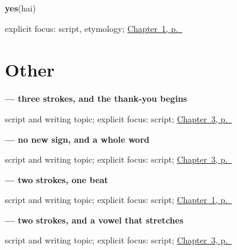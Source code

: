 \noindent\begin{minipage}[t]{\linewidth}
\raggedright
\textbf{yes}\enspace\emph{}\enspace(hai)\par
\footnotesize explicit focus: script, etymology; \hyperref[ch:ja-two-answers]{Chapter~1, p.~\pageref*{ch:ja-two-answers}}
\end{minipage}\par\smallskip

\section*{Other}

\noindent\begin{minipage}[t]{\linewidth}
\raggedright
\textbf{ — three strokes, and the thank-you begins}\par
\footnotesize script and writing topic; explicit focus: script; \hyperref[ch:ja-plain-thanks]{Chapter~3, p.~\pageref*{ch:ja-plain-thanks}}
\end{minipage}\par\smallskip

\noindent\begin{minipage}[t]{\linewidth}
\raggedright
\textbf{ — no new sign, and a whole word}\par
\footnotesize script and writing topic; explicit focus: script; \hyperref[ch:ja-plain-thanks]{Chapter~3, p.~\pageref*{ch:ja-plain-thanks}}
\end{minipage}\par\smallskip

\noindent\begin{minipage}[t]{\linewidth}
\raggedright
\textbf{ — two strokes, one beat}\par
\footnotesize script and writing topic; explicit focus: script; \hyperref[ch:ja-two-answers]{Chapter~1, p.~\pageref*{ch:ja-two-answers}}
\end{minipage}\par\smallskip

\noindent\begin{minipage}[t]{\linewidth}
\raggedright
\textbf{ — two strokes, and a vowel that stretches}\par
\footnotesize script and writing topic; explicit focus: script; \hyperref[ch:ja-plain-thanks]{Chapter~3, p.~\pageref*{ch:ja-plain-thanks}}
\end{minipage}\par\smallskip

